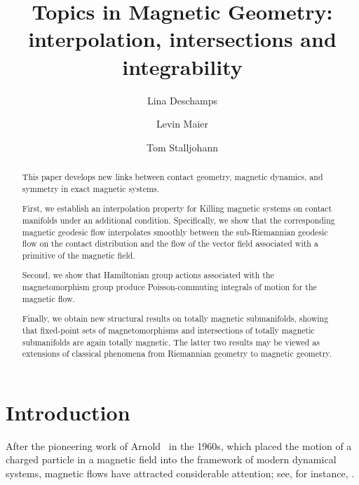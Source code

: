 \documentclass[11pt,reqno]{amsart}
\title[Topics in Magnetic Geometry]{Topics in Magnetic Geometry:\\ interpolation, intersections and integrability}
\author{Lina Deschamps}
\author{Levin Maier}
\author{Tom Stalljohann}
\theoremstyle{plain}
\theoremstyle{definition}
\numberwithin{equation}{section}
\begin{document}
	\maketitle
\renewcommand{\abstractname}{Abstract}
\begin{abstract}
This paper develops new links between contact geometry, magnetic dynamics, and symmetry in exact magnetic systems.

First, we establish an interpolation property for Killing magnetic systems on contact manifolds under an additional condition. Specifically, we show that the corresponding magnetic geodesic flow interpolates smoothly between the sub-Riemannian geodesic flow on the contact distribution and the flow of the vector field associated with a primitive of the magnetic field.

Second, we show that Hamiltonian group actions associated with the magnetomorphism group produce Poisson-commuting integrals of motion for the magnetic flow.

Finally, we obtain new structural results on totally magnetic submanifolds, showing that fixed-point sets of magnetomorphisms and intersections of totally magnetic submanifolds are again totally magnetic. The latter two results may be viewed as extensions of classical phenomena from Riemannian geometry to magnetic geometry.
\end{abstract}
	


\section{Introduction}
\label{section: Introduction}

After the pioneering work of Arnold~\cite{ar61} in the 1960s, which placed the motion of a charged particle in a magnetic field into the framework of modern dynamical systems, magnetic flows have attracted considerable attention; see, for instance, \cite{AbbMacMazzPat17,Abbondandolo2015,Assenza24,AssBenLust16,CIPP,Fat97,Man,Me09,Sor,Tai83,Tai92a,Tai92b}.\medskip
\end{document}
